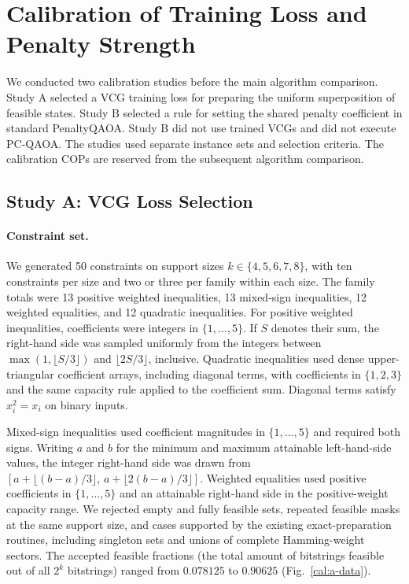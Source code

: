 \section{Calibration of Training Loss and Penalty Strength}
\label{cal:sec}
We conducted two calibration studies before the main algorithm comparison. Study A selected a VCG training loss for preparing the uniform superposition of feasible states. Study B selected a rule for setting the shared penalty coefficient in standard PenaltyQAOA. Study B did not use trained VCGs and did not execute PC-QAOA. The studies used separate instance sets and selection criteria. The calibration COPs are reserved from the subsequent algorithm comparison.

\subsection{Study A: VCG Loss Selection}
\label{cal:a}
\paragraph{Constraint set.}
We generated 50 constraints on support sizes $k\in\{4,5,6,7,8\}$, with ten constraints per size and two or three per family within each size. The family totals were 13 positive weighted inequalities, 13 mixed-sign inequalities, 12 weighted equalities, and 12 quadratic inequalities. For positive weighted inequalities, coefficients were integers in $\{1,\ldots,5\}$. If $S$ denotes their sum, the right-hand side was sampled uniformly from the integers between $\max(1,\lfloor S/3\rfloor)$ and $\lfloor2S/3\rfloor$, inclusive. Quadratic inequalities used dense upper-triangular coefficient arrays, including diagonal terms, with coefficients in $\{1,2,3\}$ and the same capacity rule applied to the coefficient sum. Diagonal terms satisfy $x_i^2=x_i$ on binary inputs.

Mixed-sign inequalities used coefficient magnitudes in $\{1,\ldots,5\}$ and required both signs. Writing $a$ and $b$ for the minimum and maximum attainable left-hand-side values, the integer right-hand side was drawn from $[a+\lfloor(b-a)/3\rfloor,\,a+\lfloor2(b-a)/3\rfloor]$. Weighted equalities used positive coefficients in $\{1,\ldots,5\}$ and an attainable right-hand side in the positive-weight capacity range. We rejected empty and fully feasible sets, repeated feasible masks at the same support size, and cases supported by the existing exact-preparation routines, including singleton sets and unions of complete Hamming-weight sectors. The accepted feasible fractions (the total amount of bitstrings feasible out of all $2^k$ bitstrings) ranged from $0.078125$ to $0.90625$ (Fig.~\ref{cal:a-data}).

